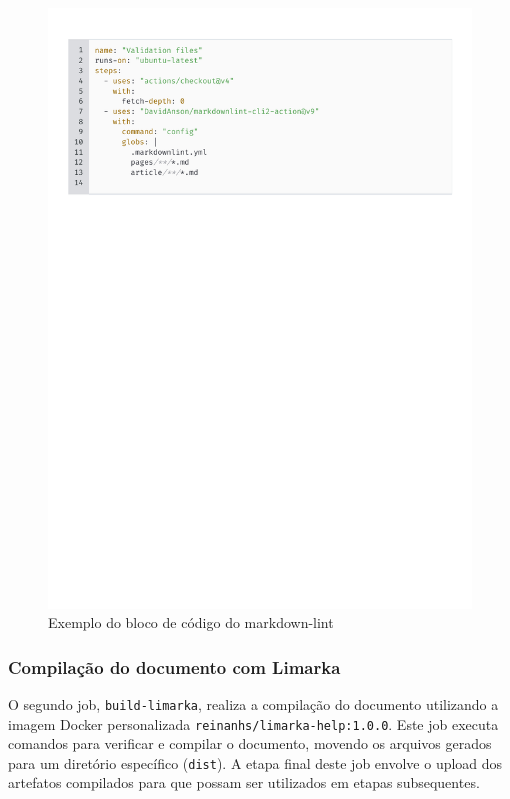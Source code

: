 \documentclass[
	12pt,				%
	oneside,			%
	a4paper,			%
	english,			%
	french,				%
	spanish,			%
	brazil				%
	]{abntex2}
\begin{document}
\begin{figure}[htbp]
\hypertarget{markdown_lint_code}{%
\caption{Exemplo do bloco de código do markdown-lint}\label{markdown_lint_code}
\begin{center}
\includegraphics[scale=0.8]{imagens/code/markdown-lint-code.pdf}
\end{center}
}
\end{figure}

\hypertarget{compilauxe7uxe3o-do-documento-com-limarka}{%
\subsubsection{Compilação do documento com
Limarka}\label{compilauxe7uxe3o-do-documento-com-limarka}}

O segundo job, \texttt{build-limarka}, realiza a compilação do documento
utilizando a imagem Docker personalizada
\texttt{reinanhs/limarka-help:1.0.0}. Este job executa comandos para
verificar e compilar o documento, movendo os arquivos gerados para um
diretório específico (\texttt{dist}). A etapa final deste job envolve o
upload dos artefatos compilados para que possam ser utilizados em etapas
subsequentes.
\end{document}
